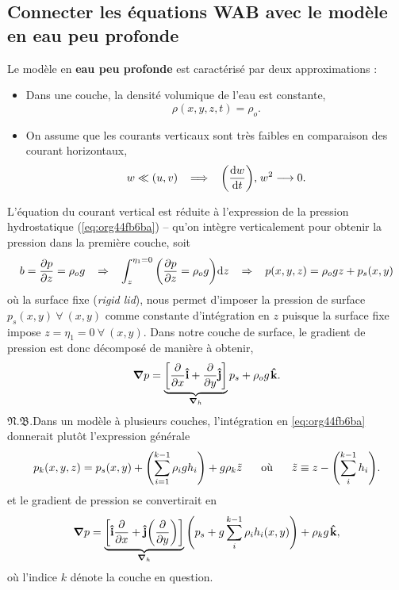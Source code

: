 \documentclass[10pt]{report}
\numberwithin{equation}{section}
\newcommand{\ivf}{\vb{\hat{i}}}
\newcommand{\jvf}{\vb{\hat{j}}}
\newcommand{\kvf}{\vb{\hat{k}}}
\newcommand{\pt}{\hspace{1pt}} %
\newcommand{\nb}{\underline{{\footnotesize\EightStarConvex}\pt $\mathfrak{N.B.}$\vphantom{p}}\hspace{3pt}}
\begin{document}
\subsection{Connecter les équations WAB avec le modèle en eau peu profonde}
\label{sec:orgd56f4ff}

Le modèle en \textbf{eau peu profonde} est caractérisé par deux approximations :
\begin{itemize}
\item Dans une couche, la densité volumique de l'eau est constante,
\begin{equation}
   \rho(x,y,z,t) = \rho_o.   
\end{equation}

\item On assume que les courants verticaux sont très faibles en comparaison des courant horizontaux,
\begin{equation}
   w \ll (u,v) \hspace{0.3cm} \Longrightarrow \hspace{0.3cm} \qty(\dv{w}{t}),\pt w^2 \longrightarrow 0.
\end{equation}
\end{itemize}
L'équation du courant vertical est réduite à l'expression de la pression hydrostatique (\ref{eq:org44fb6ba}) -- qu'on intègre verticalement pour obtenir la pression dans la première couche, soit
\begin{equation}
\label{eq:org44fb6ba}
   b = \pdv{p}{z} = \rho_o g \hspace{0.3cm}
   \Rightarrow \hspace{0.3cm} \int_{z}^{\eta_1=0} \qty( \pdv{p}{z} = \rho_o g ) \dd z \hspace{0.3cm}
   \Rightarrow \hspace{0.3cm} p(x,y,z) = \rho_o gz + p_s(x,y)
\end{equation}
où la surface fixe (\emph{rigid lid}), nous permet d'imposer la pression de surface \(p_s(x,y)\ \forall \ (x,y)\) comme constante d'intégration en \(z\) puisque la surface fixe impose \(z=\eta_1=0\ \forall\ (x,y)\).
Dans notre couche de surface, le gradient de pression est donc décomposé de manière à obtenir,
\begin{equation}
   \gradient{p} = \underbrace{\qty[\pdv{}{x}\ivf + \pdv{}{y} \jvf]}_{\gradient_h }p_s + \rho_o g \pt\kvf.
\end{equation}
\nb Dans un modèle à plusieurs couches, l'intégration en \ref{eq:org44fb6ba} donnerait plutôt l'expression générale
\begin{equation}
   p_k(x,y,z) = p_s(x,y) + \qty(\sum_{i=1}^{k-1} \rho_i g h_i) + g\rho_k \tilde{z}
   \hspace{0.6cm} \text{où}\hspace{0.6cm}
   \tilde{z}\equiv z-\qty(\sum_i^{k-1} h_i).
\end{equation}
et le gradient de pression se convertirait en
\begin{equation}
   \gradient{p} = \underbrace{\qty[\ivf\pdv{}{x} + \jvf\qty(\pdv{}{y})]}_{\gradient_h }\qty(p_s + g \sum_i^{k-1} \rho_i h_i(x,y))
   +\rho_k g \pt\kvf,
\end{equation}
où l'indice \(k\) dénote la couche en question.\bigskip
\end{document}
